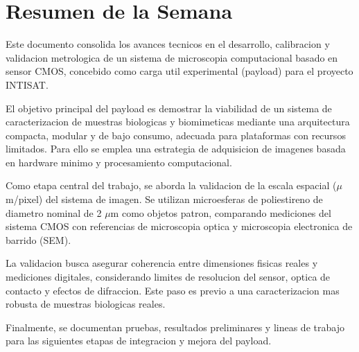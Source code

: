 ﻿\chapter{Resumen de la Semana}
Este documento consolida los avances tecnicos en el desarrollo, calibracion y validacion metrologica de un sistema de microscopia computacional basado en sensor CMOS, concebido como carga util experimental (payload) para el proyecto INTISAT.

El objetivo principal del payload es demostrar la viabilidad de un sistema de caracterizacion de muestras biologicas y biomimeticas mediante una arquitectura compacta, modular y de bajo consumo, adecuada para plataformas con recursos limitados. Para ello se emplea una estrategia de adquisicion de imagenes basada en hardware minimo y procesamiento computacional.

Como etapa central del trabajo, se aborda la validacion de la escala espacial ($\mu$m/pixel) del sistema de imagen. Se utilizan microesferas de poliestireno de diametro nominal de 2 $\mu$m como objetos patron, comparando mediciones del sistema CMOS con referencias de microscopia optica y microscopia electronica de barrido (SEM).

La validacion busca asegurar coherencia entre dimensiones fisicas reales y mediciones digitales, considerando limites de resolucion del sensor, optica de contacto y efectos de difraccion. Este paso es previo a una caracterizacion mas robusta de muestras biologicas reales.

Finalmente, se documentan pruebas, resultados preliminares y lineas de trabajo para las siguientes etapas de integracion y mejora del payload.